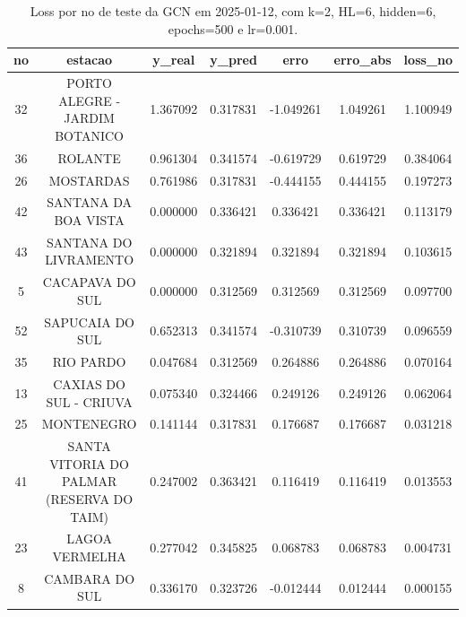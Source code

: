 \begin{table}[h]
\centering
\caption{Loss por no de teste da GCN em 2025-01-12, com k=2, HL=6, hidden=6, epochs=500 e lr=0.001.}
\label{tab:gcn_loss_k2_hl6_h6_e500_d20250112}
\begin{tabular}{ccccccc}
\toprule
no & estacao & y\_real & y\_pred & erro & erro\_abs & loss\_no \\
\midrule
32 & PORTO ALEGRE - JARDIM BOTANICO & 1.367092 & 0.317831 & -1.049261 & 1.049261 & 1.100949 \\
36 & ROLANTE & 0.961304 & 0.341574 & -0.619729 & 0.619729 & 0.384064 \\
26 & MOSTARDAS & 0.761986 & 0.317831 & -0.444155 & 0.444155 & 0.197273 \\
42 & SANTANA DA BOA VISTA & 0.000000 & 0.336421 & 0.336421 & 0.336421 & 0.113179 \\
43 & SANTANA DO LIVRAMENTO & 0.000000 & 0.321894 & 0.321894 & 0.321894 & 0.103615 \\
5 & CACAPAVA DO SUL & 0.000000 & 0.312569 & 0.312569 & 0.312569 & 0.097700 \\
52 & SAPUCAIA DO SUL & 0.652313 & 0.341574 & -0.310739 & 0.310739 & 0.096559 \\
35 & RIO PARDO & 0.047684 & 0.312569 & 0.264886 & 0.264886 & 0.070164 \\
13 & CAXIAS DO SUL - CRIUVA & 0.075340 & 0.324466 & 0.249126 & 0.249126 & 0.062064 \\
25 & MONTENEGRO & 0.141144 & 0.317831 & 0.176687 & 0.176687 & 0.031218 \\
41 & SANTA VITORIA DO PALMAR (RESERVA DO TAIM) & 0.247002 & 0.363421 & 0.116419 & 0.116419 & 0.013553 \\
23 & LAGOA VERMELHA & 0.277042 & 0.345825 & 0.068783 & 0.068783 & 0.004731 \\
8 & CAMBARA DO SUL & 0.336170 & 0.323726 & -0.012444 & 0.012444 & 0.000155 \\
\bottomrule
\end{tabular}
\end{table}
